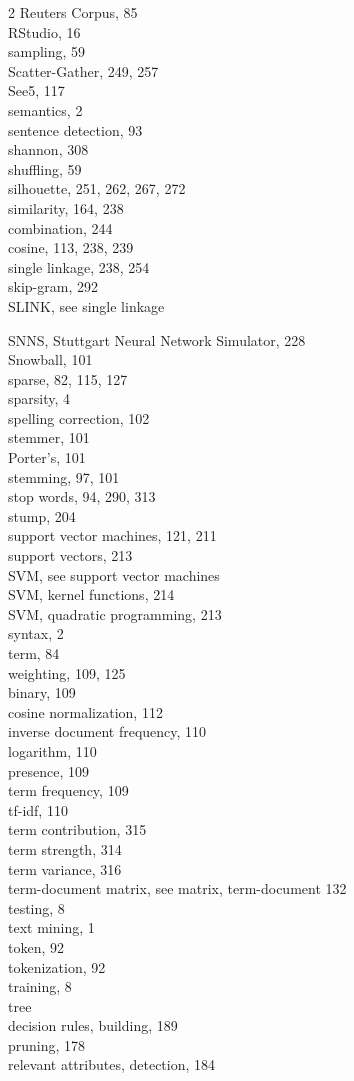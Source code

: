 \documentclass[11pt,openany,executivepaper]{book}
\begin{document}
\begin{multicols}{2}
Reuters Corpus, 85\\
RStudio, 16\\
sampling, 59\\
Scatter-Gather, 249, 257\\
See5, 117\\
semantics, 2\\
sentence detection, 93\\
shannon, 308\\
shuffling, 59\\
silhouette, 251, 262, 267, 272\\
similarity, 164, 238\\
combination, 244\\
cosine, 113, 238, 239\\
single linkage, 238, 254\\
skip-gram, 292\\
SLINK, see single linkage

SNNS, Stuttgart Neural Network Simulator, 228\\
Snowball, 101\\
sparse, 82, 115, 127\\
sparsity, 4\\
spelling correction, 102\\
stemmer, 101\\
Porter's, 101\\
stemming, 97, 101\\
stop words, 94, 290, 313\\
stump, 204\\
support vector machines, 121, 211\\
support vectors, 213\\
SVM, see support vector machines\\
SVM, kernel functions, 214\\
SVM, quadratic programming, 213\\
syntax, 2\\
term, 84\\
weighting, 109, 125\\
binary, 109\\
cosine normalization, 112\\
inverse document frequency, 110\\
logarithm, 110\\
presence, 109\\
term frequency, 109\\
tf-idf, 110\\
term contribution, 315\\
term strength, 314\\
term variance, 316\\
term-document matrix, see matrix, term-document 132\\
testing, 8\\
text mining, 1\\
token, 92\\
tokenization, 92\\
training, 8\\
tree\\
decision rules, building, 189\\
pruning, 178\\
relevant attributes, detection, 184


\end{multicols}
\end{document}
